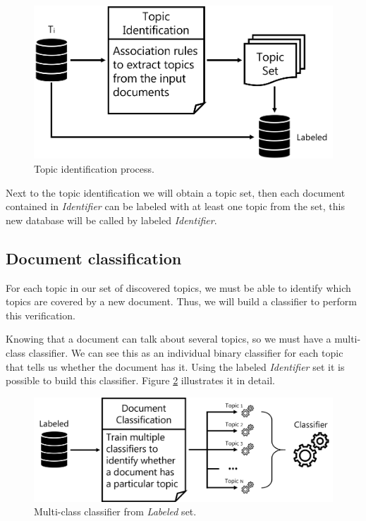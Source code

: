 \begin{figure}[h!]
	\centering
	\includegraphics[width=0.8\linewidth]{01.Chapters/04.Materials/topic-identification}
	\caption{Topic identification process.}
	\label{fig:topic-identification}
\end{figure}

Next to the topic identification we will obtain a topic set, then each document contained in \textit{Identifier} can be labeled with at least one topic from the set, this new database will be called by labeled \textit{Identifier}.

\subsection{Document classification}

For each topic in our set of discovered topics, we must be able to identify which topics are covered by a new document. Thus, we will build a classifier to perform this verification.

Knowing that a document can talk about several topics, so we must have a multi-class classifier. We can see this as an individual binary classifier for each topic that tells us whether the document has it. Using the labeled \textit{Identifier} set it is possible to build this classifier. Figure \ref{fig:document-classification} illustrates it in detail.

\begin{figure}[h!]
	\centering
	\includegraphics[width=0.9\linewidth]{01.Chapters/04.Materials/document-classification}
	\caption{Multi-class classifier from \textit{Labeled} set.}
	\label{fig:document-classification}
\end{figure}

